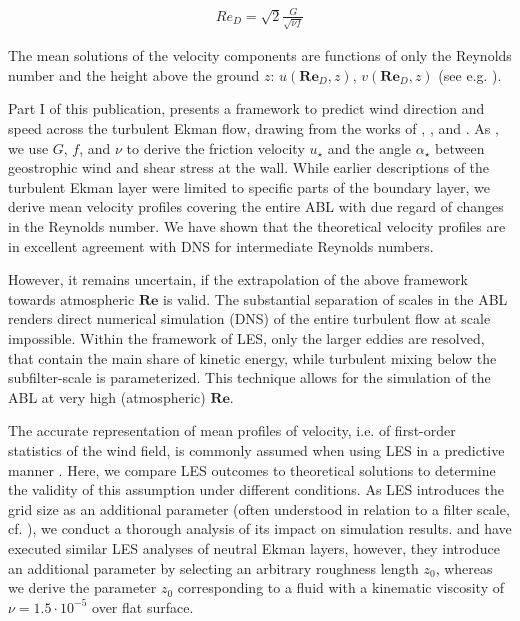 \documentclass[draft,a4paper,11pt]{article}
\newcommand{\RE}{\mathbf{Re}}
\begin{document}
\begin{align}\label{red}
 Re_D = \sqrt{2}\frac{G}{\sqrt{\nu f}}
\end{align}

The mean solutions of the velocity components are functions of only the Reynolds number and the height above the ground $z$: $u(\RE_D,z)$, $v(\RE_D,z)$ (see e.g. \cite{csanady1967resistance}).

Part I of this publication, presents a framework to predict wind direction and speed across the turbulent Ekman flow, drawing from the works of \cite{csanady1967resistance}, \cite{tennekes1973logarithmic}, and \cite{spalart1989theoretical}. As \cite{spalart1989theoretical}, we use $G$, $f$, and $\nu$ to derive the friction velocity $u_\star$ and the angle $\alpha_\star$ between geostrophic wind and shear stress at the wall. While earlier descriptions of the turbulent Ekman layer were limited to specific parts of the boundary layer, we derive mean velocity profiles covering the entire ABL with due regard of changes in the Reynolds number. We have shown that the theoretical velocity profiles are in excellent agreement with DNS for intermediate Reynolds numbers. 

However, it remains uncertain, if the extrapolation of the above framework towards atmospheric $\RE$ is valid. The substantial separation of scales in the ABL renders direct numerical simulation (DNS) of the entire turbulent flow at scale impossible. Within the framework of LES, only the larger eddies are resolved, that contain the main share of kinetic energy, while turbulent mixing below the subfilter-scale is parameterized. This technique allows for the simulation of the ABL at very high (atmospheric) $\RE$. 

The accurate representation of mean profiles of velocity, i.e. of first-order statistics of the wind field, is commonly assumed when using LES in a predictive manner  \citep{fedorovich2004convective}. Here, we compare LES outcomes to theoretical solutions to determine the validity of this assumption under different conditions. As LES introduces the grid size as an additional parameter (often understood in relation to a filter scale, cf. \cite{pope2004ten}), we conduct a thorough analysis of its impact on simulation results. \cite{esau2004simulation} and \cite{jiang2018large} have executed similar LES analyses of neutral Ekman layers, however, they introduce an additional parameter by selecting an arbitrary roughness length $z_0$, whereas we derive the parameter $z_0$ corresponding to a fluid with a kinematic viscosity of $\nu = 1.5\cdot10^{-5}$ over flat surface.
\end{document}

